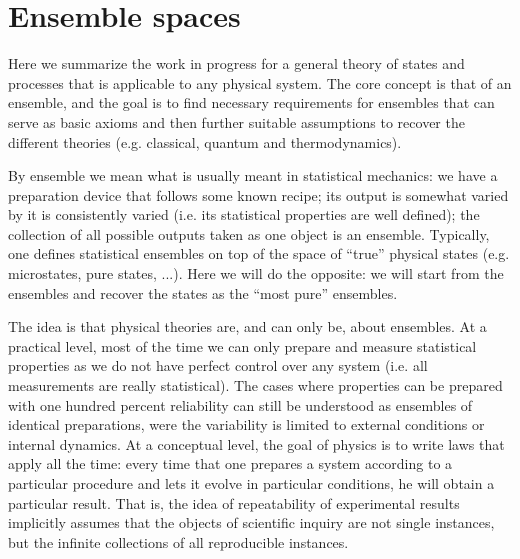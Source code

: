 
\def\>{\rangle}
\def\<{\langle}

\newcommand\mix{\mathrm{mix}}
\newcommand\component{\mathrm{comp}}
\newcommand\cospan{\mathrm{cospan}}
\newcommand\dist{\mathrm{dist}}
\newcommand\hull{\mathrm{hull}}
\newcommand\support{\mathrm{supp}}
\newcommand\capacity{\mathrm{scap}}
\newcommand\size{\mathrm{frac}}
\newcommand\fcap{\mathrm{fcap}}

\newcommand\vspan{\mathrm{span}}
\newcommand\cl{\mathrm{cl}}

\def\separate{\downmodels}
\def\nseparate{\ndownmodels}
\def\ortho{\perp}

\newcommand{\ens}[1][e] {\mathsf{#1}} %
\newcommand{\Ens}[1][E] {\mathcal{#1}} %

\chapter{Ensemble spaces}

Here we summarize the work in progress for a general theory of states and processes that is applicable to any physical system. The core concept is that of an ensemble, and the goal is to find necessary requirements for ensembles that can serve as basic axioms and then further suitable assumptions to recover the different theories (e.g. classical, quantum and thermodynamics).

By ensemble we mean what is usually meant in statistical mechanics: we have a preparation device that follows some known recipe; its output is somewhat varied by it is consistently varied (i.e. its statistical properties are well defined); the collection of all possible outputs taken as one object is an ensemble. Typically, one defines statistical ensembles on top of the space of ``true'' physical states (e.g. microstates, pure states, ...). Here we will do the opposite: we will start from the ensembles and recover the states as the ``most pure'' ensembles.

The idea is that physical theories are, and can only be, about ensembles. At a practical level, most of the time we can only prepare and measure statistical properties as we do not have perfect control over any system (i.e. all measurements are really statistical). The cases where properties can be prepared with one hundred percent reliability can still be understood as ensembles of identical preparations, were the variability is limited to external conditions or internal dynamics. At a conceptual level, the goal of physics is to write laws that apply all the time: every time that one prepares a system according to a particular procedure and lets it evolve in particular conditions, he will obtain a particular result. That is, the idea of repeatability of experimental results implicitly assumes that the objects of scientific inquiry are not single instances, but the infinite collections of all reproducible instances.

